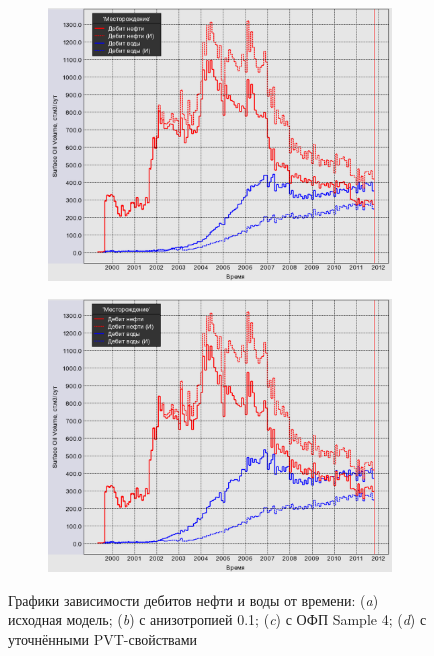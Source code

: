 \documentclass[a4paper,12pt]{article}
\begin{document}
\begin{figure}[H]
\begin{subfigure}[t]{\dimexpr.5\linewidth-1.3em\relax}
	\centering
	\includegraphics[width=.9\linewidth]{rates_ofp_model}
\end{subfigure}%
\hfill %
%
\begin{subfigure}[t]{\dimexpr.5\linewidth-1.3em\relax}
	\centering
	\includegraphics[width=.9\linewidth]{rates_pvt_model}
\end{subfigure}
\captionsetup{justification=centering} %
\caption{Графики зависимости дебитов нефти и воды от времени: ({\itshape a}) исходная модель; ({\itshape b}) с анизотропией 0.1; ({\itshape c}) с ОФП Sample 4; ({\itshape d}) с уточнёнными PVT-свойствами} 
\label{fig:rates_variations}
\end{figure}
\end{document}
